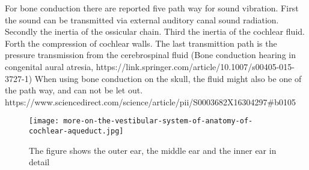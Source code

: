 For bone conduction there are reported five path way for sound vibration. First the sound can be transmitted via external auditory canal sound radiation. Secondly the inertia of the ossicular chain. Third the inertia of the cochlear fluid. Forth the compression of cochlear walls. The last transmittion path is the pressure transmission from the cerebrospinal fluid (Bone conduction hearing in congenital aural atresia, https://link.springer.com/article/10.1007/s00405-015-3727-1) When using bone conduction on the skull, the fluid might also be one of the path way, and can not be let out. 
https://www.sciencedirect.com/science/article/pii/S0003682X16304297#b0105
 \begin{figure}[H]
	\centering
		\texttt{[image: more-on-the-vestibular-system-of-anatomy-of-cochlear-aqueduct.jpg]}
		\caption{The figure shows the outer ear, the middle ear and the inner ear in detail}
		\label{fig:hearing_system_detail}
\end{figure}



